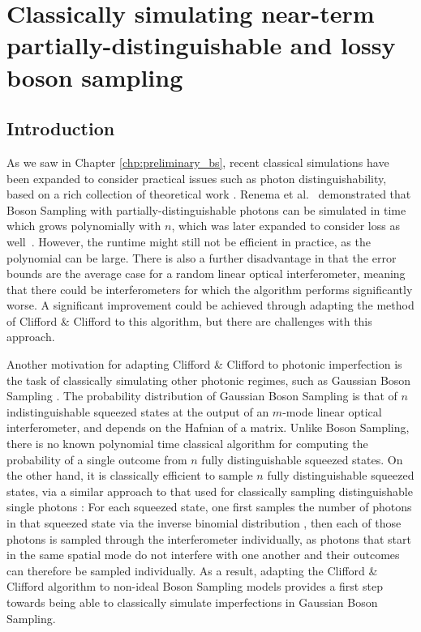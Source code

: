 \chapter{Classically simulating near-term partially-distinguishable and lossy boson sampling}
\label{chp:classical_sim}

\section{Introduction}

As we saw in Chapter \ref{chp:preliminary_bs}, recent classical simulations have been expanded to consider practical issues such as photon distinguishability, based on a rich collection of theoretical work \cite{deguise2014, tamma2014, shchesnovich2014, rohde2015, shchesnovich2015, tichy2015, tillmann2015}. 
Renema et al.~\cite{renema2018} demonstrated that Boson Sampling with partially-distinguishable photons can be simulated in time which grows polynomially with $n$, which was later expanded to consider loss as well~\cite{renema2018loss}. 
However, the runtime might still not be efficient in practice, as the polynomial can be large. There is also a further disadvantage in that the error bounds are the average case for a random linear optical interferometer, meaning that there could be interferometers for which the algorithm performs significantly worse.
A significant improvement could be achieved through adapting the method of Clifford \& Clifford to this algorithm, but there are challenges with this approach.

Another motivation for adapting Clifford \& Clifford to photonic imperfection is the task of classically simulating other photonic regimes, such as Gaussian Boson Sampling \cite{hamilton2017}. The probability distribution of Gaussian Boson Sampling is that of $n$ indistinguishable squeezed states at the output of an $m$-mode linear optical interferometer, and depends on the Hafnian of a matrix. Unlike Boson Sampling, there is no known polynomial time classical algorithm for computing the probability of a single outcome from $n$ fully distinguishable squeezed states. On the other hand, it is classically efficient to sample $n$ fully distinguishable squeezed states, via a similar approach to that used for classically sampling distinguishable single photons \cite{aaronson2014}: For each squeezed state, one first samples the number of photons in that squeezed state via the inverse binomial distribution \cite{wu2019}, then each of those photons is sampled through the interferometer individually, as photons that start in the same spatial mode do not interfere with one another and their outcomes can therefore be sampled individually. As a result, adapting the Clifford \& Clifford algorithm to non-ideal Boson Sampling models provides a first step towards being able to classically simulate imperfections in Gaussian Boson Sampling.

